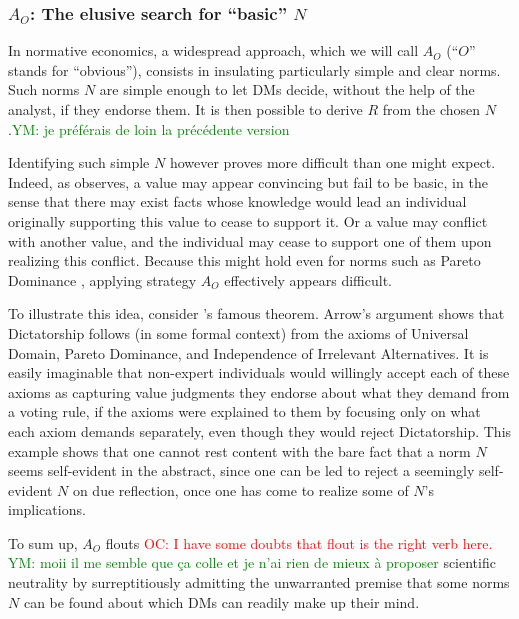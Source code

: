 \documentclass[preprint, french, english, 11pt, authoryear]{elsarticle}%
\newcommand{\protectforpdf}[1]{\texorpdfstring{\ensuremath{#1}}{#1}}
\newcommand{\commentYM}[1]{\textcolor{green}{YM: #1}}
\newcommand{\commentOC}[1]{\textcolor{red}{OC: #1}}
\begin{document}
\subsubsection{\texorpdfstring{$A_O$}{AO}: The elusive search for ``basic'' \protectforpdf{N}}
In normative economics, a widespread approach, which we will call $A_O$ (``$O$'' stands for “obvious”), consists in insulating particularly simple and clear norms. Such norms $N$ are simple enough to let \acp{DM} decide, without the help of the analyst, if they endorse them. It is then possible to derive $R$ from the chosen $N$.\commentYM{je préférais de loin la précédente version}

Identifying such simple $N$ however proves more difficult than one might expect. Indeed, as \citet{sen_nature_1967} observes, a value may appear convincing but fail to be basic, in the sense that there may exist facts whose knowledge would lead an individual originally supporting this value to cease to support it. Or a value may conflict with another value, and the individual may cease to support one of them upon realizing this conflict. Because this might hold even for norms such as Pareto Dominance \citep[ch. 5 and 6]{sen_collective_1984}, applying strategy $A_O$ effectively appears difficult.

To illustrate this idea, consider \citeauthor{arrow_social_2012}’s \citeyearpar{arrow_social_2012} famous theorem. Arrow's argument shows that Dictatorship follows (in some formal context) from the axioms of Universal Domain, Pareto Dominance, and Independence of Irrelevant Alternatives. It is easily imaginable that non-expert individuals would willingly accept each of these axioms as capturing value judgments they endorse about what they demand from a voting rule, if the axioms were explained to them by focusing only on what each axiom demands separately, even though they would reject Dictatorship. This example shows that one cannot rest content with the bare fact that a norm $N$ seems self-evident in the abstract, since one can be led to reject a seemingly self-evident $N$ on due reflection, once one has come to realize some of $N$'s implications.

To sum up, $A_O$ flouts \commentOC{I have some doubts that flout is the right verb here.} \commentYM{moii il me semble que ça colle et je n'ai rien de mieux à proposer} scientific neutrality by surreptitiously admitting the unwarranted premise that 
some norms $N$ can be found about which \acp{DM} can readily make up their mind.
\end{document}
